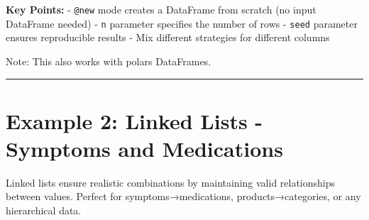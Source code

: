 \documentclass[
  letterpaper,
]{scrbook}
\begin{document}
\textbf{Key Points:} - \texttt{@new} mode creates a DataFrame from
scratch (no input DataFrame needed) - \texttt{n} parameter specifies the
number of rows - \texttt{seed} parameter ensures reproducible results -
Mix different strategies for different columns

Note: This also works with polars DataFrames.

\begin{center}\rule{0.5\linewidth}{0.5pt}\end{center}

\section{Example 2: Linked Lists - Symptoms and
Medications}\label{example-2-linked-lists---symptoms-and-medications}

Linked lists ensure realistic combinations by maintaining valid
relationships between values. Perfect for symptoms→medications,
products→categories, or any hierarchical data.
\end{document}
